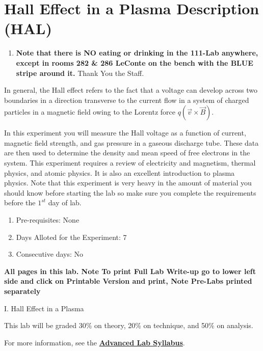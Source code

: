 \documentclass{../lab}
\begin{document}
\maketitle

\tableofcontents
\section{Hall Effect in a Plasma Description (HAL)}

\begin{enumerate}
    \item \textbf{Note that there is NO eating or drinking in the 111-Lab anywhere, except in rooms 282 \& 286 LeConte on the bench with the BLUE stripe around it.} Thank You the Staff.
\end{enumerate}

In general, the Hall effect refers to the fact that a voltage can develop across two boundaries in a direction transverse to the current flow in a system of charged particles in a magnetic field owing to the Lorentz force $q (\vec{v} \times \vec{B})$.

In this experiment you will measure the Hall voltage as a function of current, magnetic field strength, and gas pressure in a gaseous discharge tube. These data are then used to determine the density and mean speed of free electrons in the system. This experiment requires a review of electricity and magnetism, thermal physics, and atomic physics. It is also an excellent introduction to plasma physics. Note that this experiment is very heavy in the amount of material you should know before starting the lab so make sure you complete the requirements before the $1^{st}$ day of lab.

\begin{enumerate}
    \item Pre-requisites: None
    \item Days Alloted for the Experiment: 7
    \item Consecutive days: No
\end{enumerate}


\textbf{All pages in this lab. Note To print Full Lab Write-up go to lower left side and click on Printable Version and print, Note Pre-Labs printed separately }


I. Hall Effect in a Plasma

This lab will be graded 30\% on theory, 20\% on technique, and 50\% on analysis.

For more information, see the \href{\AdvancedLabSyllabus}{\textbf{Advanced Lab Syllabus}}.
\end{document}
